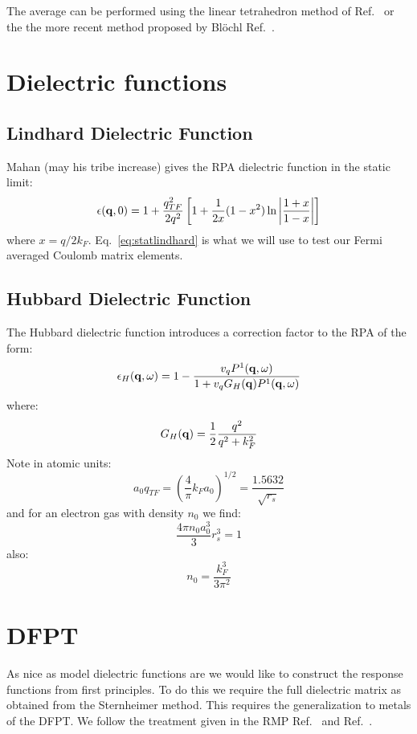 The average can be performed using the linear tetrahedron method of Ref.~\cite{lehmann72} or the
the more recent method proposed by Bl\"ochl Ref.~\cite{blochl94}.

\section{Dielectric functions}
\subsection{Lindhard Dielectric Function}
Mahan (may his tribe increase) gives the RPA dielectric function in the static limit:
%
\begin{equation}
\label{eq:statlindhard}
\epsilon({\bf q},0) = 1 + \frac{q^{2}_{TF}}{2q^{2}}\left[1+\frac{1}{2x}(1-x^{2})\ln\left|\frac{1+x}{1-x}\right|\right]
\end{equation}
%
where $x = q/2k_{F}$.
Eq.~\ref{eq:statlindhard} is what we will use to test our Fermi averaged Coulomb matrix elements.

\subsection{Hubbard Dielectric Function}
The Hubbard dielectric function introduces a correction factor to the RPA of the form:
%
\begin{equation}
\epsilon_{H}({\bf q},\omega) = 1 - \frac{v_{q}P^{1}({\bf q},\omega)}{1+ v_{q}G_{H}({\bf q})P^{1}({\bf q},\omega)}
\end{equation}
%
where:
%
\begin{equation}
G_{H}({\bf q}) = \frac{1}{2}\frac{q^{2}}{q^{2} + k^{2}_{F}}
\end{equation}
%
Note in atomic units:
%
\begin{equation}
a_{0}q_{TF} = (\frac{4}{\pi}k_{F}a_{0})^{1/2} = \frac{1.5632}{\sqrt{r_{s}}}
\end{equation}
%
and for an electron gas with density $n_{0}$ we find:
%
\begin{equation}
\frac{4\pi n_{0} a^{3}_{0}}{3}r^{3}_{s} = 1
\end{equation}
%
also: 
%
\begin{equation}
n_{0} = \frac{k^{3}_{F}}{3\pi^{2}}
\end{equation}

\section{DFPT}
As nice as model dielectric functions are we would like to construct the
response functions from first principles. To do this we require the full
dielectric matrix as obtained from the Sternheimer method. This requires
the generalization to metals of the DFPT. We follow the treatment given in
the RMP Ref.~\cite{baroni01} and Ref.~\cite{degironcoli95}.

